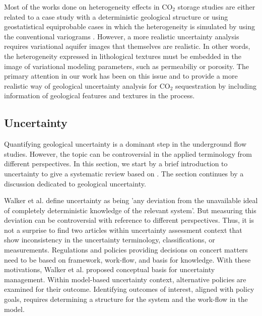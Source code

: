 Most of the works done on heterogeneity effects in $\mbox{CO}_2$ storage studies are either related to a case study with a deterministic geological structure or using geostatistical equiprobable cases in which the heterogeneity is simulated by using the conventional variograms \cite{nicot2008evaluation,LGH1992611,le2010corrective,LGH1993959,rutqvist2002cap,rutqvist2007}. However, a more realistic uncertainty analysis requires variational aquifer images that themselves are realistic. In other words, the heterogeneity expressed in lithological textures must be embedded in the image of variational modeling parameters, such as permeabiliy or porosity. The primary  attention in our work has been on this issue and to provide a more realistic way of geological uncertainty analysis for $\mbox{CO}_2$ sequestration by including information of geological features and textures in the process. 

\subsection{Uncertainty}

Quantifying geological uncertainty is a dominant step in the underground flow studies. However, the topic can be controversial in the applied terminology from different perspectives. In this section, we start by a brief introduction to uncertainty to give a systematic review based on \cite{walker2003defining}. The section continues by a discussion dedicated to geological uncertainty.

Walker et al. define uncertainty as being 'any deviation from the unavailable ideal of completely deterministic knowledge of the relevant system'. But measuring this deviation can be controversial with reference to different perspectives. Thus, it is not a surprise to find two articles within uncertainty assessment context that show inconsistency in the uncertainty terminology, classifications, or measurements. Regulations and policies providing decisions on concert matters need to be based on framework, work-flow, and basis for knowledge. With these motivations, Walker et al. proposed conceptual basis for uncertainty management. Within model-based uncertainty context, alternative policies are examined for their outcome. Identifying outcomes of interest, aligned with policy goals, requires determining a structure for the system and the work-flow in the model. 

